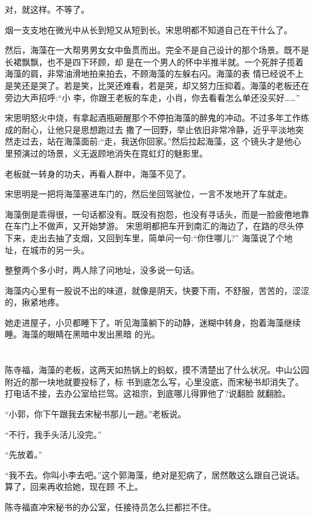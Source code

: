 \documentclass[11pt,a4paper,onecolumn]{article}
\begin{document}
对，就这样。不等了。

烟一支支地在微光中从长到短又从短到长。宋思明都不知道自己在干什么了。

然后，海藻在一大帮男男女女中鱼贯而出。完全不是自己设计的那个场景。既不是长裙飘飘，也不是四下环顾，却
是在一个男人的怀中半推半就。一个死胖子揽着海藻的肩，非常油滑地拍来拍去，不顾海藻的左躲右闪。海藻的表
情已经说不上是笑还是哭了。若是笑，比哭还难看，若是哭，却又努力压抑着。海藻的老板还在旁边大声招呼:``小
李，你跟王老板的车走，小肖，你去看看怎么单还没买好……''

宋思明怒火中烧，有拿起酒瓶砸醒那个不停拍海藻的醉鬼的冲动。不过多年工作练成的耐心，让他只是思想跑过去
撒了一回野，举止依旧非常冷静，近乎平淡地突然走过去，站在海藻面前:``走，我送你回家。''然后拉起海藻，这
个镜头才是他心里预演过的场景，义无返顾地消失在霓虹灯的魅影里。

老板就一转身的功夫，再看人群中，海藻不见了。

宋思明是一把将海藻塞进车门的，然后坐回驾驶位，一言不发地开了车就走。

海藻倒是乖得很，一句话都没有。既没有抱怨，也没有寻话头，而是一脸疲倦地靠在车门上不做声，又开始梦游。
宋思明都把车开到南汇的海边了，在路的尽头停下来，走出去抽了支烟，又回到车里，简单问一句:``你住哪儿?''
海藻说了个地址，在城市的另一头。

整整两个多小时，两人除了问地址，没多说一句话。

海藻内心里有一股说不出的味道，就像是阴天，快要下雨，不舒服，苦苦的，涩涩的，揪紧地疼。

她走进屋子，小贝都睡下了。听见海藻躺下的动静，迷糊中转身，抱着海藻继续睡。海藻的眼睛在黑暗中发出黑暗
的光。

\section[\thesection]{}

陈寺福，海藻的老板，这两天如热锅上的蚂蚁，摸不清楚出了什么状况。中山公园附近的那一块地就要投标了，标
书到底怎么写，心里没底，而宋秘书却消失了。打电话不接，去办公室给拦驾。这祖宗，到底哪儿得罪他了?说翻脸
就翻脸。

``小郭，你下午跟我去宋秘书那儿一趟。''老板说。

``不行，我手头活儿没完。''

``先放着。''

``我不去。你叫小李去吧。''这个郭海藻，绝对是犯病了，居然敢这么跟自己说话。算了，回来再收拾她，现在顾
不上。

陈寺福直冲宋秘书的办公室，任接待员怎么拦都拦不住。
\end{document}
